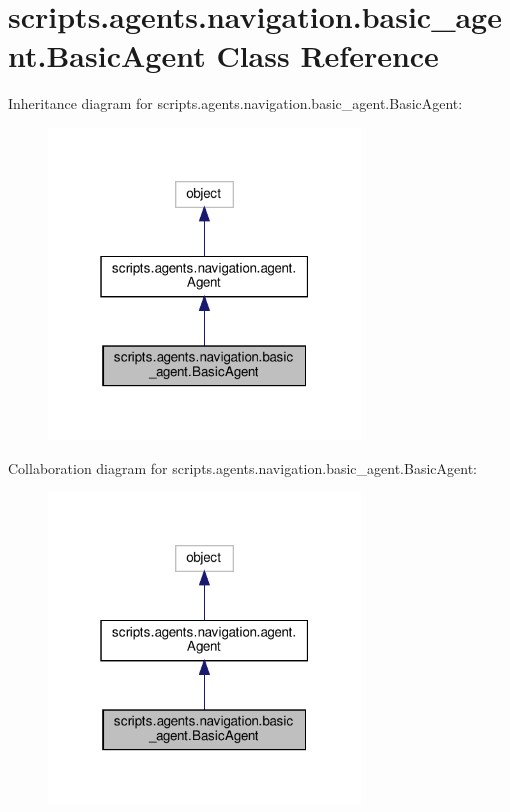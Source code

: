 \hypertarget{classscripts_1_1agents_1_1navigation_1_1basic__agent_1_1BasicAgent}{}\section{scripts.\+agents.\+navigation.\+basic\+\_\+agent.\+Basic\+Agent Class Reference}
\label{classscripts_1_1agents_1_1navigation_1_1basic__agent_1_1BasicAgent}


Inheritance diagram for scripts.\+agents.\+navigation.\+basic\+\_\+agent.\+Basic\+Agent\+:\nopagebreak
\begin{figure}[H]
\begin{center}
\leavevmode
\includegraphics[width=235pt]{d7/d3d/classscripts_1_1agents_1_1navigation_1_1basic__agent_1_1BasicAgent__inherit__graph}
\end{center}
\end{figure}


Collaboration diagram for scripts.\+agents.\+navigation.\+basic\+\_\+agent.\+Basic\+Agent\+:\nopagebreak
\begin{figure}[H]
\begin{center}
\leavevmode
\includegraphics[width=235pt]{dd/ddc/classscripts_1_1agents_1_1navigation_1_1basic__agent_1_1BasicAgent__coll__graph}
\end{center}
\end{figure}
